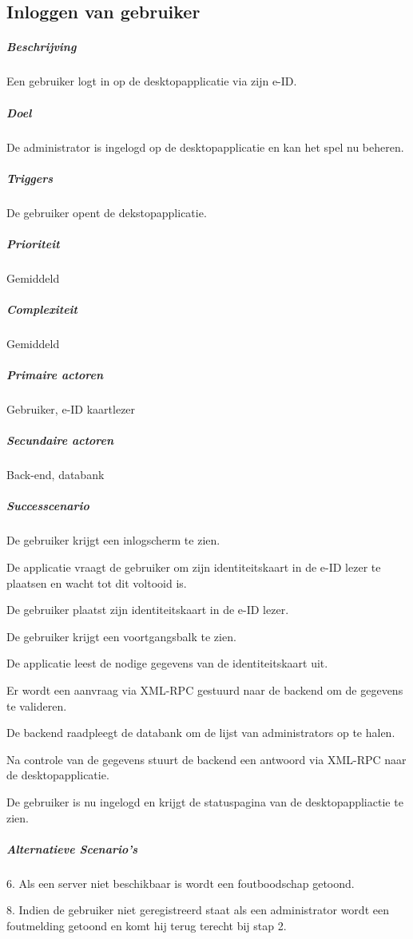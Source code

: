 \subsection{Inloggen van gebruiker}
\begin{compact}
\subparagraph{Beschrijving} Een gebruiker logt in op de desktopapplicatie via zijn e-ID.
\subparagraph{Doel} De administrator is ingelogd op de desktopapplicatie en kan het spel nu beheren.
\subparagraph{Triggers}De gebruiker opent de dekstopapplicatie.
\subparagraph{Prioriteit}Gemiddeld
\subparagraph{Complexiteit}Gemiddeld
\subparagraph{Primaire actoren}Gebruiker, e-ID kaartlezer
\subparagraph{Secundaire actoren}Back-end, databank
\subparagraph{Successcenario}
\begin{enumerate_compact}
 \item De gebruiker krijgt een inlogscherm te zien.
 \item De applicatie vraagt de gebruiker om zijn identiteitskaart in de e-ID lezer te plaatsen en wacht tot dit voltooid is.
 \item De gebruiker plaatst zijn identiteitskaart in de e-ID lezer.
 \item De gebruiker krijgt een voortgangsbalk te zien.
 \item De applicatie leest de nodige gegevens van de identiteitskaart uit.
 \item Er wordt een aanvraag via XML-RPC gestuurd naar de backend om de gegevens te valideren.
 \item De backend raadpleegt de databank om de lijst van administrators op te halen.
 \item Na controle van de gegevens stuurt de backend een antwoord via XML-RPC naar de desktopapplicatie.
 \item De gebruiker is nu ingelogd en krijgt de statuspagina van de desktopappliactie te zien.
\end{enumerate_compact}
\subparagraph{Alternatieve Scenario's}
\begin{enumerate_compact}
	\item[6.] Als een server niet beschikbaar is wordt een foutboodschap getoond.
	\item[8.] Indien de gebruiker niet geregistreerd staat als een administrator wordt een foutmelding getoond en komt hij terug terecht bij stap 2.
\end{enumerate_compact}
\end{compact}


